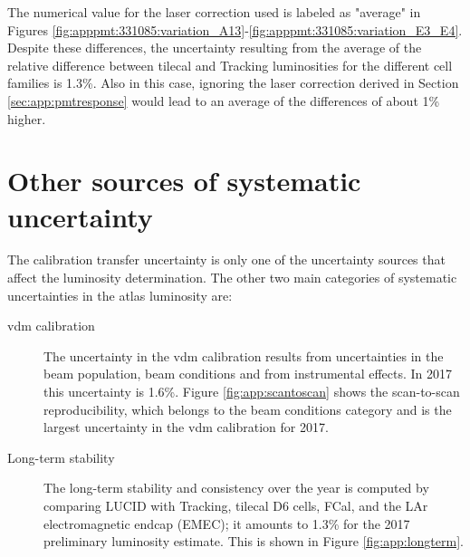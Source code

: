 \noindent The numerical value for the laser correction used is labeled as "average" in Figures \ref{fig:apppmt:331085:variation_A13}-\ref{fig:apppmt:331085:variation_E3_E4}. 
Despite these differences, the uncertainty resulting from the average of the relative difference between 
\gls{tilecal} and Tracking luminosities for the different cell families is 1.3\%. Also in this case, ignoring the laser correction derived in 
Section \ref{sec:app:pmtresponse} would lead to an average of the differences of about 1\% higher. 

\FloatBarrier

\section{Other sources of systematic uncertainty}

The calibration transfer uncertainty is only one of the uncertainty sources that affect the luminosity determination. 
The other two main categories of systematic uncertainties in the \gls{atlas} luminosity are:
\begin{description}
\item[\gls{vdm} calibration] The uncertainty in the \gls{vdm} calibration results from uncertainties in the 
beam population, beam conditions and from instrumental effects. In 2017 this uncertainty is 1.6\%. 
Figure \ref{fig:app:scantoscan} shows the scan-to-scan reproducibility, which belongs to the beam conditions category 
and is the largest uncertainty in the \gls{vdm} calibration for 2017.   
\item[Long-term stability] The long-term stability and consistency over the year is computed by comparing LUCID with
 Tracking, \gls{tilecal} D6 cells, FCal, and the LAr electromagnetic endcap (EMEC); 
 it amounts to 1.3\% for the 2017 preliminary 
luminosity estimate. This is shown in Figure \ref{fig:app:longterm}.
\end{description}

